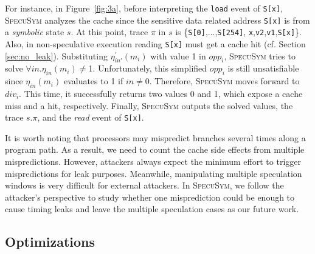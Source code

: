 \documentclass[sigconf,screen]{acmart}
\newcommand{\SpecuSym}{\textsc{SpecuSym} }
\begin{document}
For instance, in Figure~\ref{fig:3a}, before interpreting the \texttt{load} 
event of \texttt{S[x]}, \SpecuSym analyzes the cache since the sensitive 
data related address {\texttt{S[x]}} is from a \textit{symbolic} state $s$. 
At this point, trace $\pi$ in $s$ is {\{\texttt{S[0]},...,\texttt{S[254]},
\texttt{x},\texttt{v2},\texttt{v1},\texttt{S[x]}\}}. Also, in non-speculative 
execution reading {\small\texttt{S[x]}} must get a cache hit (cf. Section
\ref{sec:no_leak}). Substituting $\mathit{\eta_{in'}^\prime(m_i)}$ with value 
1 in $\mathit{opp_i}$, \SpecuSym tries to solve 
$\forall\mathit{in}.\mathit{\eta_{in}(m_i)\neq}$1. 
Unfortunately, this simplified $\mathit{opp_i}$ is still unsatisfiable since 
$\mathit{\eta_{in}(m_i)}$ evaluates to 1 if $\mathit{in}\neq0$. Therefore, 
\SpecuSym moves forward to $\mathit{div_i}$. This time, it successfully returns 
two values 0 and 1, which expose a cache miss and a hit, respectively. Finally, 
\SpecuSym outputs the solved values, the trace $s.\pi$, and the \textit{read} 
event of {\texttt{S[x]}}.


It is worth noting that processors may mispredict branches several times 
along a program path. As a result, we need to count the cache side effects 
from multiple mispredictions. However, attackers always expect the minimum 
effort to trigger mispredictions for leak purposes. Meanwhile, manipulating 
multiple speculation windows is very difficult for external attackers. In 
\textsc{SpecuSym}, we follow the attacker's perspective to study whether one 
misprediction could be enough to cause timing leaks and leave the multiple 
speculation cases as our future work. 



\subsection{Optimizations}
\label{sec:optimize}
\end{document}
